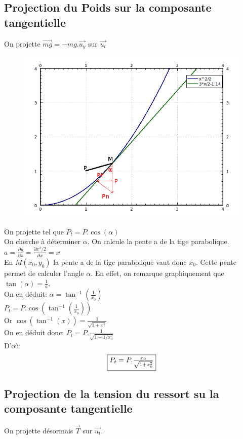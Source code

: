 \documentclass[10pt,a4paper]{article}
\begin{document}
\subsection{Projection du Poids sur la composante tangentielle}
On projette $\vec{mg}=-mg.\vec{u_y}$ sur $\vec{u_t}$\\
\begin{figure}[H]
	\includegraphics[scale=0.7]{GraphMathZoomProjectionPoids.png}
\end{figure}

On projette tel que $P_t=P.\cos(\alpha)$\\
On cherche à déterminer $\alpha$.
On calcule la pente a de la tige parabolique. $a=\frac{\partial y}{\partial x}=\frac{\partial x^2/2}{\partial x}=x$ \\
En $M(x_0,y_0)$ la pente a de la tige parabolique vaut donc $x_0$.
Cette pente permet de calculer l'angle $\alpha$. En effet, on remarque graphiquement que $\tan(\alpha)=\frac{1}{a}$.\\
On en déduit: $\alpha=\tan^{-1}(\frac{1}{x_0})$\\
$P_t=P.\cos(\tan^{-1}(\frac{1}{x_0})) $\\
Or $\cos(\tan^{-1}(x))=\frac{1}{\sqrt{1+x^2}}$\\
On en déduit donc: $P_t=P.\frac{1}{\sqrt{1+1/x^2_0}}$\\
D'où: 
\[\fbox{$P_t=P.\frac{x_0}{\sqrt{1+x^2_0}}$}\]

\subsection{Projection de la tension du ressort su la composante tangentielle}
On projette désormais $\vec{T}$ sur $\vec{u_t}$.\\
\end{document}
